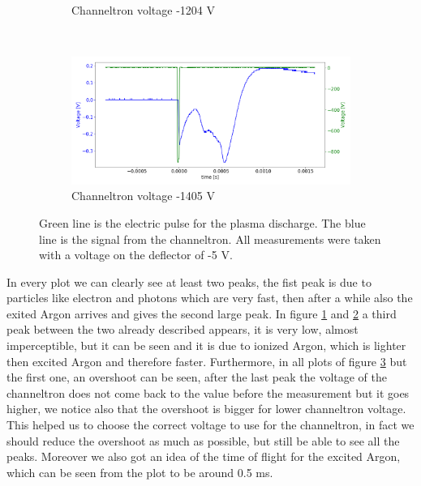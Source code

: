 \documentclass[a4paper,10pt]{article}
\begin{document}
\begin{figure}[H]
\begin{subfigure}[t]{0.45 \textwidth}
    \caption{Channeltron voltage -1204 V}\label{channeltron3}
  \end{subfigure}
  ~
  \begin{subfigure}[t]{0.45 \textwidth}
    \centering
    \includegraphics[width=\textwidth]{channeltron5}
    \caption{Channeltron voltage -1405 V}\label{channeltron4}
  \end{subfigure}
  \caption{Green line is the electric pulse for the plasma discharge. The blue line is the signal from the channeltron. All measurements were taken with a voltage on the deflector of -5 V. }
  \label{channeltron}
\end{figure}
In every plot we can clearly see at least two peaks, the fist peak is due to particles like electron and photons which are very fast, then after a while also the exited Argon arrives and gives the second large peak. In figure \ref{channeltron3} and \ref{channeltron4} a third peak between the two already described appears, it is very low, almost imperceptible, but it can be seen and it is due to ionized Argon, which is lighter then excited Argon and therefore faster. Furthermore, in all plots of figure \ref{channeltron} but the first one, an overshoot can be seen, after the last peak the voltage of the channeltron does not come back to the value before the measurement but it goes higher, we notice also that the overshoot is bigger for lower channeltron voltage. This helped us to choose the correct voltage to use for the channeltron, in fact we should reduce the overshoot as much as possible, but still be able to see all the peaks. Moreover we also got an idea of the time of flight for the excited Argon, which can be seen from the plot to be around 0.5 ms.
\end{document}
